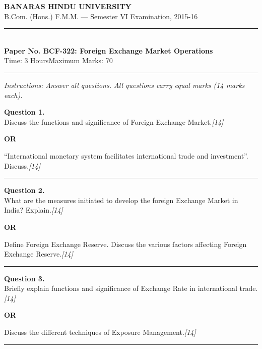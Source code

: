 \documentclass[11pt,a4paper]{article}
\newcommand{\pts}[1]{\hfill   \textit{[#1]}}
\begin{document}
\begin{center}
  {\large\bfseries BANARAS HINDU UNIVERSITY}\\[2pt]
  {\normalsize B.Com. (Hons.) F.M.M. --- Semester VI Examination, 2015-16}\\[6pt]
  \rule{0.8\linewidth}{0.5pt}\\[6pt]
  {\large\bfseries Paper No. BCF-322: Foreign Exchange Market Operations}\\[4pt]
  {\normalsize Time: 3 Hours\hfill Maximum Marks: 70}
\end{center}

\rule{\linewidth}{0.4pt}

\smallskip



\noindent   \textit{Instructions: Answer all questions. All questions carry equal marks (14 marks each).}

\bigskip




\noindent   \textbf{Question 1.} \\
Discuss the functions and significance of Foreign Exchange Market.\pts{14}

\centerline{   \textbf{OR}}

``International monetary system facilitates international trade and investment''. Discuss.\pts{14}

\medskip\rule{\linewidth}{0.2pt}




\noindent   \textbf{Question 2.} \\
What are the measures initiated to develop the foreign Exchange Market in India? Explain.\pts{14}

\centerline{   \textbf{OR}}

Define Foreign Exchange Reserve. Discuss the various factors affecting Foreign Exchange Reserve.\pts{14}

\medskip\rule{\linewidth}{0.2pt}

\pagebreak




\noindent   \textbf{Question 3.} \\
Briefly explain functions and significance of Exchange Rate in international trade.\pts{14}

\centerline{   \textbf{OR}}

Discuss the different techniques of Exposure Management.\pts{14}

\medskip\rule{\linewidth}{0.2pt}
\end{document}

